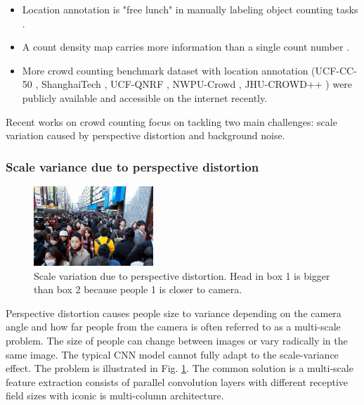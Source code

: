 \begin{itemize}
    \item Location annotation is "free lunch" in manually labeling object counting tasks \cite{lempitsky2010learning}.
    \item A count density map carries more information than a single count number \cite{zhang2016single}.
    \item More crowd counting benchmark dataset with location annotation (UCF-CC-50 \cite{idrees2013multi}, ShanghaiTech \cite{zhang2016single}, UCF-QNRF \cite{idrees2018composition}, NWPU-Crowd \cite{gao2020nwpu}, JHU-CROWD++ \cite{sindagi2020jhucrowd}) 
were publicly available and accessible on the internet recently.
\end{itemize}

Recent works on crowd counting focus on tackling two main challenges: scale variation caused by perspective distortion and background noise.

\subsubsection{Scale variance due to perspective distortion} \hfill

\begin{figure}[htbp]
\centerline{\includegraphics[width=0.4\textwidth]{Picture/problem/part_a_train_IMG_44-annotate-scale.jpg}}
\caption{Scale variation due to perspective distortion. Head in box 1 is bigger than box 2 because people 1 is closer to camera.}
\label{fig:scale}
\end{figure}

Perspective distortion causes people size to variance depending on the camera angle and how far people from the camera is often referred to as a multi-scale problem. The size of people can change between images or vary radically in the same image. The typical CNN model cannot fully adapt to the scale-variance effect. The problem is illustrated in Fig. \ref{fig:scale}. The common solution is a multi-scale feature extraction consists of parallel convolution layers with different receptive field sizes with iconic is multi-column architecture.

